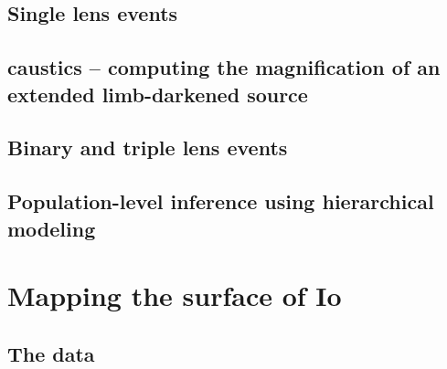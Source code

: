 \documentclass[12pt,dvipsnames]{report}
\newcommand{\ssf}[1]{\textsf{#1}}
\begin{document}
\section{Single lens events}
%
%

\section{\ssf{caustics} -- computing the magnification of an extended limb-darkened source}
\section{Binary and triple lens events}
\section{Population-level inference using hierarchical modeling}

\chapter{Mapping the surface of Io}
\label{ch:mapping_io}
\section{The data}
\end{document}
